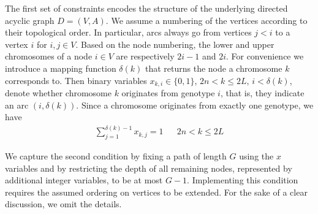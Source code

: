 \documentclass[runningheads]{llncs}
\begin{document}
The first set of constraints encodes the structure of the underlying directed acyclic graph $D=(V,A)$. We assume a numbering of the vertices
according to their topological order. In particular, arcs always go from vertices $j<i$ to a vertex $i$ for $i,j\in V$. Based on the node numbering, the lower and upper chromosomes of a node $i \in V$ are respectively $2i-1$ and $2i$. For convenience we introduce a mapping function $\delta(k)$ that returns the node a chromosome $k$ corresponds to.
Then binary variables $x_{k,i}\in\{0,1\}$, $2n < k \leq 2L$, $i<\delta(k)$, denote whether chromosome $k$ originates from genotype $i$, that is, they indicate an arc $(i,\delta(k))$.
Since a chromosome originates from exactly one genotype, we have
\begin{align}
  \label{eq:ilp_x_1}
  \sum_{j=1}^{\delta(k)- 1} x_{k,j} = 1 && 2n < k \leq 2L
\end{align}

We capture the second condition by fixing a path of length $G$ using the $x$ variables and by restricting the depth of all remaining nodes, represented by additional
integer variables, to be at most $G-1$. Implementing this condition requires the assumed ordering on vertices to be extended. For the sake of a clear discussion, we omit the details.
\end{document}
